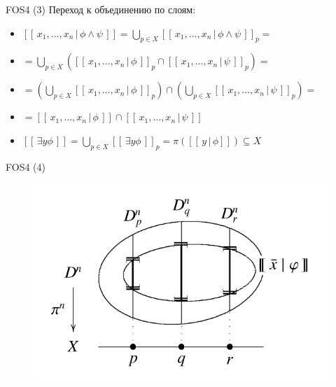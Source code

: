 \documentclass{beamer}
\begin{document}
\begin{frame}{FOS4 (3)}
Переход к объединению по слоям:\\
\bigskip
{\small
	\begin{itemize}
		\item $[ \! [ \, x_1, \ldots, x_n \, \vert \, \phi \wedge \psi \, ] \! ] = \bigcup_{p \in X} [ \! [ \, x_1, \ldots, x_n \, \vert \, \phi \wedge \psi \, ] \! ]_p =$\\ \medskip
		\item[] $= \bigcup_{p \in X}( [ \! [ \, x_1, \ldots, x_n \, \vert \, \phi \, ] \! ]_p \cap [ \! [ \, x_1, \ldots, x_n \, \vert \, \psi \, ] \! ]_p ) =$\\ \medskip
		\item[] $= \left(\bigcup_{p \in X}[ \! [ \, x_1, \ldots, x_n \, \vert \, \phi \, ] \! ]_p \right) \cap \left(\bigcup_{p \in X}[ \! [ \, x_1, \ldots, x_n \, \vert \, \psi \, ] \! ]_p \right) =$\\ \medskip
		\item[] $= [ \! [ \, x_1, \ldots, x_n \, \vert \, \phi \, ] \! ] \cap [ \! [ \, x_1, \ldots, x_n \, \vert \, \psi \, ] \! ]$\\ 
		\bigskip
		\item $[ \! [ \, \exists y \phi \, ] \! ] = \bigcup_{p \in X}[ \! [ \, \exists y \phi \, ] \! ]_p = \pi([ \! [ \, y \, \vert \, \phi ] \! ]) \subseteq X$
	\end{itemize}
}
\end{frame}

\begin{frame}{FOS4 (4)}
\begin{center}
	\begin{figure}[H]
		\includegraphics[scale=0.4]{fos4_1.png} 
	\end{figure}
\end{center}
\end{frame}
\end{document}
